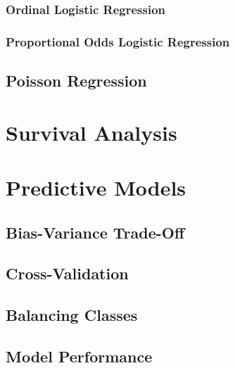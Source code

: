 \documentclass[]{book}
\begin{document}
\hypertarget{ordinal-logistic-regression}{%
\subsection{Ordinal Logistic Regression}\label{ordinal-logistic-regression}}

\hypertarget{proportional-odds-logistic-regression}{%
\subsection{Proportional Odds Logistic Regression}\label{proportional-odds-logistic-regression}}

\hypertarget{poisson-regression}{%
\section{Poisson Regression}\label{poisson-regression}}

\hypertarget{surv-anal}{%
\chapter{Survival Analysis}\label{surv-anal}}

\hypertarget{pred-mod}{%
\chapter{Predictive Models}\label{pred-mod}}

\hypertarget{bias-variance-trade-off}{%
\section{Bias-Variance Trade-Off}\label{bias-variance-trade-off}}

\hypertarget{cross-validation}{%
\section{Cross-Validation}\label{cross-validation}}

\hypertarget{balancing-classes}{%
\section{Balancing Classes}\label{balancing-classes}}

\hypertarget{model-performance}{%
\section{Model Performance}\label{model-performance}}
\end{document}
